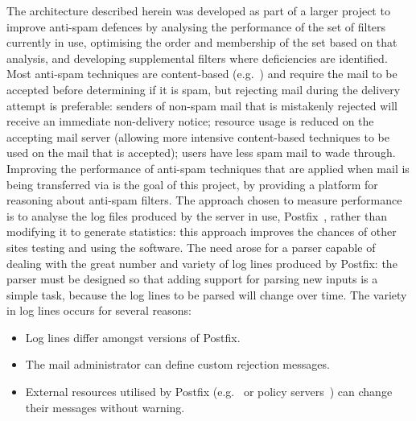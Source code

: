 \documentclass{svmult}
\begin{document}
The architecture described herein was developed as part of a larger project
to improve anti-spam defences by analysing the performance of the set of
filters currently in use, optimising the order and membership of the set
based on that analysis, and developing supplemental filters where
deficiencies are identified.  Most anti-spam techniques are content-based
(e.g.~\cite{a-plan-for-spam, word-stemming, relaxed-online-svms}) and
require the mail to be accepted before determining if it is spam, but
rejecting mail during the delivery attempt is preferable: senders of
non-spam mail that is mistakenly rejected will receive an immediate
non-delivery notice; resource usage is reduced on the accepting mail server
(allowing more intensive content-based techniques to be used on the mail
that is accepted); users have less spam mail to wade through.  Improving
the performance of anti-spam techniques that are applied when mail is being
transferred via \SMTP{}\footnotemark{} is the goal of this project, by
providing a platform for reasoning about anti-spam filters.  The approach
chosen to measure performance is to analyse the log files produced by the
\SMTP{} server in use, Postfix~\cite{postfix}, rather than modifying it to
generate statistics: this approach improves the chances of other sites
testing and using the software.  The need arose for a parser capable of
dealing with the great number and variety of log lines produced by Postfix:
the parser must be designed so that adding support for parsing new inputs
is a simple task, because the log lines to be parsed will change over time.
The variety in log lines occurs for several reasons:

\begin{itemize}

    \item Log lines differ amongst versions of Postfix.
        
    \item The mail administrator can define custom rejection messages.

    \item External resources utilised by Postfix (e.g.\ \DNSBL{} or policy
        servers~\cite{policy-servers}) can change their messages without
        warning.

\end{itemize}
\end{document}
